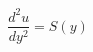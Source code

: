\documentclass[preview,border=2pt]{standalone}
\begin{document}
\[
\frac{d^2u}{dy^2}= S(y)
\]
\end{document}
